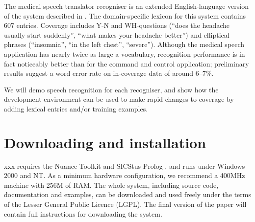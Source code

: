 \documentclass[11pt,twoside]{article}
\begin{document}
The medical speech translator recogniser is an extended
English-language version of the system described in
\cite{RaynerBouillon2002}. The domain-specific lexicon for this system
contains 607 entries. Coverage includes Y-N and WH-questions (``does
the headache usually start suddenly'', ``what makes your headache
better'') and elliptical phrases (``insomnia'', ``in the left chest'',
``severe'').  Although the medical speech application has nearly twice
as large a vocabulary, recognition performance is in fact noticeably
better than for the command and control application; preliminary
results suggest a word error rate on in-coverage data of around 6--7\%.

We will demo speech recognition for each recogniser, and show
how the development environment can be used to make rapid changes
to coverage by adding lexical entries and/or training examples.

\section{Downloading and installation}
\label{Section:Downloading}

{\sc xxx} requires the Nuance Toolkit \cite{Nuance} and SICStus Prolog
\cite{Sicstus}, and runs under Windows 2000 and NT. As a minimum hardware
configuration, we recommend a 400MHz machine with 256M of RAM.
The whole system, including source code, documentation and examples,
can be downloaded and used freely under the terms of the 
Lesser General Public Licence (LGPL). The final version of the paper
will contain full instructions for downloading the system.



\end{document}
